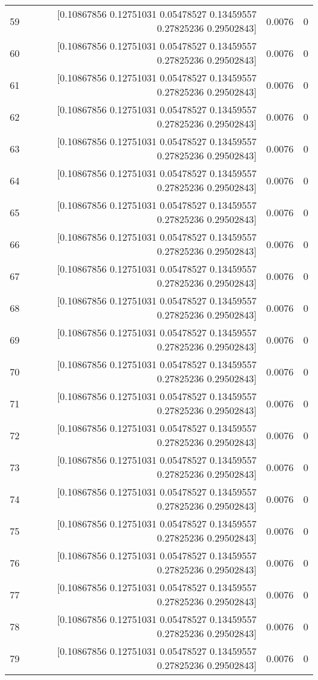 \begin{longtable}{lrrr}
59 & [0.10867856 0.12751031 0.05478527 0.13459557 0.27825236 0.29502843] & 0.0076 & 0 \\
60 & [0.10867856 0.12751031 0.05478527 0.13459557 0.27825236 0.29502843] & 0.0076 & 0 \\
61 & [0.10867856 0.12751031 0.05478527 0.13459557 0.27825236 0.29502843] & 0.0076 & 0 \\
62 & [0.10867856 0.12751031 0.05478527 0.13459557 0.27825236 0.29502843] & 0.0076 & 0 \\
63 & [0.10867856 0.12751031 0.05478527 0.13459557 0.27825236 0.29502843] & 0.0076 & 0 \\
64 & [0.10867856 0.12751031 0.05478527 0.13459557 0.27825236 0.29502843] & 0.0076 & 0 \\
65 & [0.10867856 0.12751031 0.05478527 0.13459557 0.27825236 0.29502843] & 0.0076 & 0 \\
66 & [0.10867856 0.12751031 0.05478527 0.13459557 0.27825236 0.29502843] & 0.0076 & 0 \\
67 & [0.10867856 0.12751031 0.05478527 0.13459557 0.27825236 0.29502843] & 0.0076 & 0 \\
68 & [0.10867856 0.12751031 0.05478527 0.13459557 0.27825236 0.29502843] & 0.0076 & 0 \\
69 & [0.10867856 0.12751031 0.05478527 0.13459557 0.27825236 0.29502843] & 0.0076 & 0 \\
70 & [0.10867856 0.12751031 0.05478527 0.13459557 0.27825236 0.29502843] & 0.0076 & 0 \\
71 & [0.10867856 0.12751031 0.05478527 0.13459557 0.27825236 0.29502843] & 0.0076 & 0 \\
72 & [0.10867856 0.12751031 0.05478527 0.13459557 0.27825236 0.29502843] & 0.0076 & 0 \\
73 & [0.10867856 0.12751031 0.05478527 0.13459557 0.27825236 0.29502843] & 0.0076 & 0 \\
74 & [0.10867856 0.12751031 0.05478527 0.13459557 0.27825236 0.29502843] & 0.0076 & 0 \\
75 & [0.10867856 0.12751031 0.05478527 0.13459557 0.27825236 0.29502843] & 0.0076 & 0 \\
76 & [0.10867856 0.12751031 0.05478527 0.13459557 0.27825236 0.29502843] & 0.0076 & 0 \\
77 & [0.10867856 0.12751031 0.05478527 0.13459557 0.27825236 0.29502843] & 0.0076 & 0 \\
78 & [0.10867856 0.12751031 0.05478527 0.13459557 0.27825236 0.29502843] & 0.0076 & 0 \\
79 & [0.10867856 0.12751031 0.05478527 0.13459557 0.27825236 0.29502843] & 0.0076 & 0 \\

\end{longtable}
